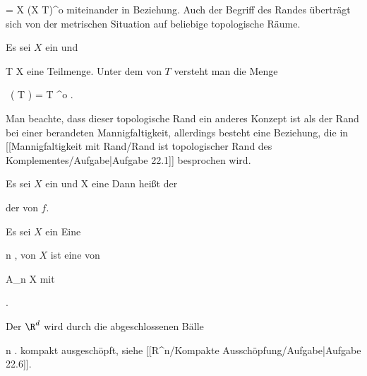 \mavergleichskettedisp
{\vergleichskette
{ 
}
{ =} { X \setminus (X \setminus T)^{o}
}
{ } {
}
{ } {
}
{ } {
}
}
{}{}{}
miteinander in Beziehung. Auch der Begriff des Randes überträgt sich von der metrischen Situation auf beliebige topologische Räume.

{
}
{

Es sei $X$ ein
und

\mavergleichskette
{\vergleichskette
{ T
}
{ \subseteq }{ X
}
{  }{
}
{    }{
}
{   }{
}
}
{}{}{}
eine Teilmenge. Unter dem
von $T$ versteht man die Menge

\mavergleichskettedisp
{\vergleichskette
{  \, ( T )
}
{ =} {   \setminus T ^{o}
}
{ } {
}
{ } {
}
{ } {
}
}
{}{}{.}

}
Man beachte, dass dieser topologische Rand ein anderes Konzept ist als der Rand bei einer berandeten Mannigfaltigkeit, allerdings besteht eine Beziehung, die in
[[Mannigfaltigkeit mit Rand/Rand ist topologischer Rand des Komplementes/Aufgabe|Aufgabe 22.1]]
besprochen wird.

{}
{

Es sei $X$ ein
und
 { X } {\R
} {}
eine
Dann heißt der

 {  }

der  von $f$.

}

{}
{

Es sei $X$ ein
Eine 

 {}
 {n \in \N} {}
 {} {} {} {,}
von $X$ ist eine
von

\mavergleichskette
{\vergleichskette
{ A_n
}
{ \subseteq }{ X
}
{  }{
}
{    }{
}
{   }{
}
}
{}{}{}
mit

 { . }

}

Der $\R^d$ wird durch die abgeschlossenen Bälle

 {}
 {n \in \N} {}
 {} {} {} {.}
kompakt ausgeschöpft, siehe
[[R^n/Kompakte Ausschöpfung/Aufgabe|Aufgabe 22.6]].


